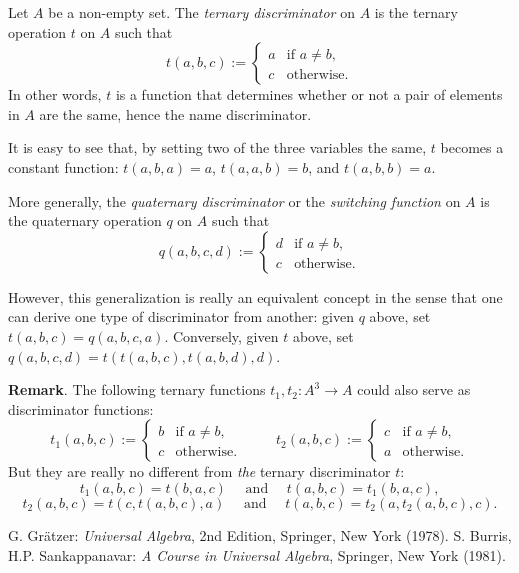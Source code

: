 \documentclass[12pt]{article}
\begin{document}
Let $A$ be a non-empty set.  The \emph{ternary discriminator} on $A$ is the ternary operation $t$ on $A$ such that
\begin{displaymath}
t(a,b,c):= \left\{
\begin{array}{ll}
a & \textrm{if } a\ne b,\\
c & \textrm{otherwise.}
\end{array}
\right.
\end{displaymath}
In other words, $t$ is a function that determines whether or not a pair of elements in $A$ are the same, hence the name discriminator.

It is easy to see that, by setting two of the three variables the same, $t$ becomes a constant function: $t(a,b,a)=a$, $t(a,a,b)=b$, and $t(a,b,b)=a$.

More generally, the \emph{quaternary discriminator} or the \emph{switching function} on $A$ is the quaternary operation $q$ on $A$ such that
\begin{displaymath}
q(a,b,c,d):= \left\{
\begin{array}{ll}
d & \textrm{if } a\ne b,\\
c & \textrm{otherwise.}
\end{array}
\right.
\end{displaymath}

However, this generalization is really an equivalent concept in the sense that one can derive one type of discriminator from another: given $q$ above, set $t(a,b,c)=q(a,b,c,a)$.  Conversely, given $t$ above, set $q(a,b,c,d) = t(t(a,b,c),t(a,b,d),d)$.

\textbf{Remark}.  The following ternary functions $t_1,t_2:A^3\to A$ could also serve as discriminator functions:
\begin{displaymath}
t_1(a,b,c):= \left\{
\begin{array}{ll}
b & \textrm{if } a\ne b,\\
c & \textrm{otherwise.}
\end{array}
\right.
\hspace{1cm}
t_2(a,b,c):= \left\{
\begin{array}{ll}
c & \textrm{if } a\ne b,\\
a & \textrm{otherwise.}
\end{array}
\right.
\end{displaymath}
But they are really no different from \emph{the} ternary discriminator $t$:
$$t_1(a,b,c)=t(b,a,c)\quad \mbox{ and }\quad t(a,b,c)=t_1(b,a,c),$$
$$t_2(a,b,c)=t(c,t(a,b,c),a)\quad \mbox{ and }\quad t(a,b,c)=t_2(a,t_2(a,b,c),c).$$

\begin{thebibliography}{9}
 G. Gr\"{a}tzer: {\em Universal Algebra}, 2nd Edition, Springer, New York (1978).
 S. Burris, H.P. Sankappanavar: {\em A Course in Universal Algebra}, Springer, New York (1981).
\end{thebibliography}
\end{document}
